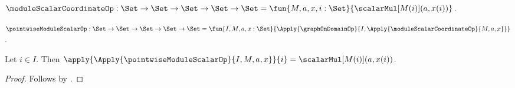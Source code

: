 \begin{definition}\label{module_scalar_coordinate_op}
    $\moduleScalarCoordinateOp:
        \Set\to\Set\to\Set\to\Set\to\Set
        =\fun{M,a,x,i:\Set}{\scalarMul[M(i)](a,x(i))}$.
\end{definition}

\begin{definition}\label{pointwise_module_scalar_op}
    $\pointwiseModuleScalarOp:
        \Set\to\Set\to\Set\to\Set\to\Set
        =\fun{I,M,a,x:\Set}{
            \Apply{\graphOnDomainOp}{
                I,\Apply{\moduleScalarCoordinateOp}{M,a,x}}}$.
\end{definition}

\begin{proposition}\label{pointwise_module_scalar_coordinate}
    Let $i\in I$.
    Then
        $\apply{\Apply{\pointwiseModuleScalarOp}{I,M,a,x}}{i}
            =\scalarMul[M(i)](a,x(i))$.
\end{proposition}
\begin{proof}
    Follows by
        .
\end{proof}

